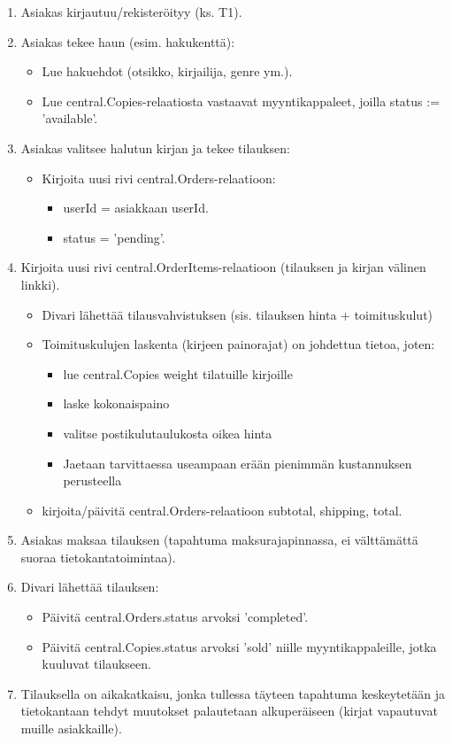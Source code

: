\documentclass[11pt,a4paper]{article}
\begin{document}
\begin{enumerate}
	\item Asiakas kirjautuu/rekisteröityy (ks. T1).
	\item Asiakas tekee haun (esim. hakukenttä):
	      \begin{itemize}
		      \item Lue hakuehdot (otsikko, kirjailija, genre ym.).
		      \item Lue central.Copies-relaatiosta vastaavat myyntikappaleet, joilla status := 'available'.
	      \end{itemize}
	\item Asiakas valitsee halutun kirjan ja tekee tilauksen:
	      \begin{itemize}
		      \item Kirjoita uusi rivi central.Orders-relaatioon:
		            \begin{itemize}
			            \item userId = asiakkaan userId.
			            \item status = 'pending'.
		            \end{itemize}
	      \end{itemize}
	\item Kirjoita uusi rivi central.OrderItems-relaatioon (tilauksen ja kirjan välinen linkki).
	      \begin{itemize}
		      \item Divari lähettää tilausvahvistuksen (sis. tilauksen hinta + toimituskulut)
		      \item Toimituskulujen laskenta (kirjeen painorajat) on johdettua tietoa, joten:
		            \begin{itemize}
			            \item lue central.Copies weight tilatuille kirjoille
			            \item laske kokonaispaino
			            \item valitse postikulutaulukosta oikea hinta
						\item Jaetaan tarvittaessa useampaan erään pienimmän kustannuksen perusteella
		            \end{itemize}
		      \item kirjoita/päivitä central.Orders-relaatioon subtotal, shipping, total.
	      \end{itemize}
	\item Asiakas maksaa tilauksen (tapahtuma maksurajapinnassa, ei välttämättä suoraa tietokantatoimintaa).
	\item Divari lähettää tilauksen:
	      \begin{itemize}
		      \item Päivitä central.Orders.status arvoksi 'completed'.
		      \item Päivitä central.Copies.status arvoksi 'sold' niille myyntikappaleille, jotka kuuluvat tilaukseen.
	      \end{itemize}
	\item Tilauksella on aikakatkaisu, jonka tullessa täyteen tapahtuma keskeytetään ja tietokantaan tehdyt muutokset palautetaan alkuperäiseen (kirjat vapautuvat muille asiakkaille).
\end{enumerate}
\end{document}
